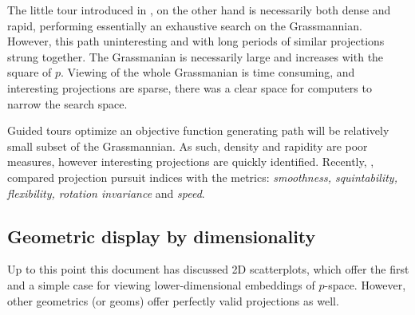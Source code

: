\documentclass{monashthesis}
\begin{document}
The little tour introduced in \textcite{mcdonald_interactive_1982}, on
the other hand is necessarily both dense and rapid, performing
essentially an exhaustive search on the Grassmannian. However, this path
uninteresting and with long periods of similar projections strung
together. The Grassmanian is necessarily large and increases with the
square of \(p\). Viewing of the whole Grassmanian is time consuming, and
interesting projections are sparse, there was a clear space for
computers to narrow the search space.

Guided tours \autocite{hurley_analyzing_1990} optimize an objective
function generating path will be relatively small subset of the
Grassmannian. As such, density and rapidity are poor measures, however
interesting projections are quickly identified. Recently,
\textcite{laa_using_2019}, compared projection pursuit indices with the
metrics: \emph{smoothness, squintability, flexibility, rotation
invariance} and \emph{speed}.

\subsection{Geometric display by
dimensionality}\label{geometric-display-by-dimensionality}

Up to this point this document has discussed 2D scatterplots, which
offer the first and a simple case for viewing lower-dimensional
embeddings of \(p\)-space. However, other geometrics (or geoms) offer
perfectly valid projections as well.
\end{document}
